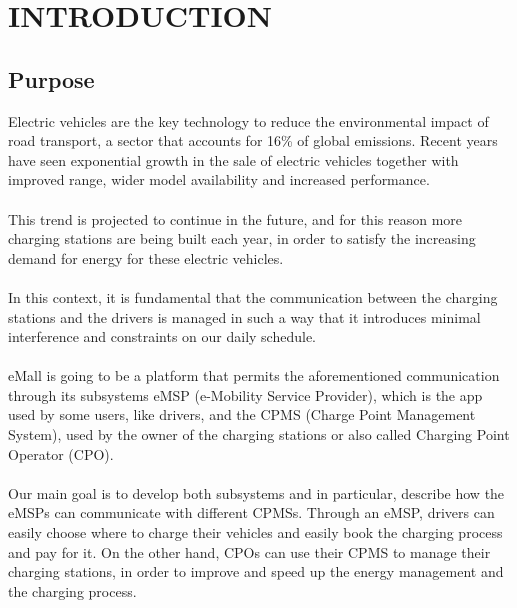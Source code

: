 \newcommand\row{\stepcounter{row}\arabic{row}}
\chapter{INTRODUCTION}
\label{ch:introduction}%
\section{Purpose}
Electric vehicles are the key technology to reduce the environmental impact of road transport, a sector that accounts for 16\% of global emissions. Recent years have seen exponential growth in the sale of electric vehicles together with improved range, wider model availability and increased performance. \\ \\
This trend is projected to continue in the future, and for this reason more charging stations are being built each year, in order to satisfy the increasing demand for energy for these electric vehicles. \\ \\
In this context, it is fundamental that the communication between the charging stations and the drivers is managed in such a way that it introduces minimal interference and constraints on 
our daily schedule. \\ \\
eMall is going to be a platform that permits the aforementioned communication through its subsystems eMSP (e-Mobility Service Provider), which is the app used by some users, like drivers, and the CPMS (Charge Point Management System), used by the owner of the charging stations or also called Charging Point Operator (CPO). \\ \\
Our main goal is to develop both subsystems and in particular, describe how the eMSPs can communicate with different CPMSs. Through an eMSP, drivers can easily choose where to charge their vehicles and easily book the charging process and pay for it. On the other hand, CPOs can use their CPMS to manage their charging stations, in order to improve and speed up the energy management and the charging process.
\label{sec:purpose}
\newpage
